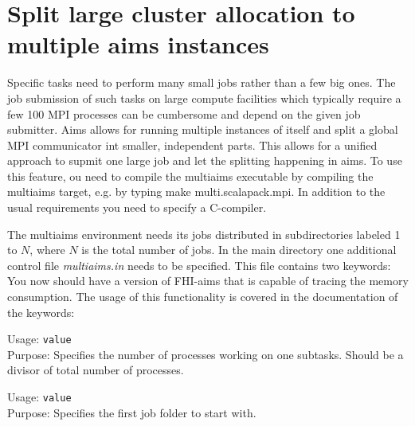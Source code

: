 \chapter[Multiple Instances of Aims]{Split large cluster allocation to multiple aims instances}
\label{appendix_multiaims}

Specific tasks need to perform many small jobs rather than a few big ones. The job submission of such tasks on large compute facilities which typically require a few 100 MPI processes can be cumbersome and depend on the given job submitter. Aims allows for running multiple instances of itself and split a global MPI communicator int smaller, independent parts. This allows for a unified approach to supmit one large job and let the splitting happening in aims.   
To use this feature, ou need to compile the multiaims executable by compiling the multiaims target, e.g. by typing make multi.scalapack.mpi.
In addition to the usual requirements you need to specify a C-compiler. 

The multiaims environment needs its jobs distributed in subdirectories labeled 1 to $N$, where $N$ is the total number of jobs. In the main directory one additional control file \textit{multiaims.in} needs to be specified. This file contains two keywords:
You now should have a version of FHI-aims that is capable of tracing the memory
consumption. The usage of this functionality is covered in the documentation of the keywords:

{
  \noindent
  Usage:  \texttt{value} \\[1.0ex]  
  Purpose: Specifies the number of processes working on one subtasks. 
  Should be a divisor of total number of processes. 
}

{
  \noindent
  Usage:  \texttt{value} \\[1.0ex]  
  Purpose: Specifies the first job folder to start with. 
}

